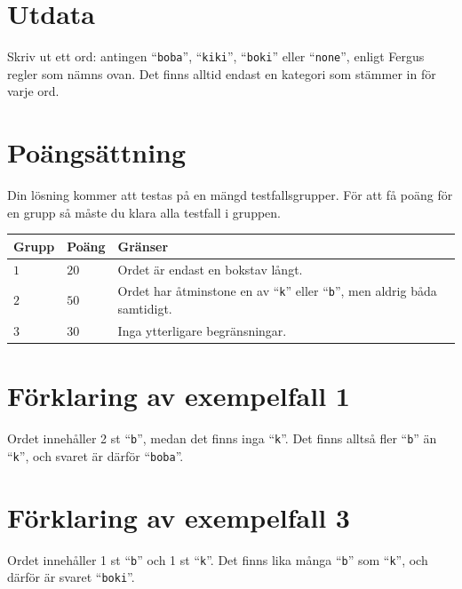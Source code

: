 \section*{Utdata}
Skriv ut ett ord: antingen ``\texttt{boba}'', ``\texttt{kiki}'', ``\texttt{boki}'' eller ``\texttt{none}'', enligt Fergus regler som nämns ovan.
Det finns alltid endast en kategori som stämmer in för varje ord.

\section*{Poängsättning}
Din lösning kommer att testas på en mängd testfallsgrupper.
För att få poäng för en grupp så måste du klara alla testfall i gruppen.

\noindent
\begin{tabular}{| l | l | p{12cm} |}
  \hline
  \textbf{Grupp} & \textbf{Poäng} & \textbf{Gränser} \\ \hline
  $1$    & $20$       & Ordet är endast en bokstav långt. \\ \hline
  $2$    & $50$       & Ordet har åtminstone en av ``\texttt{k}'' eller ``\texttt{b}'', men aldrig båda samtidigt. \\ \hline
  $3$    & $30$       & Inga ytterligare begränsningar. \\ \hline
\end{tabular}

\section*{Förklaring av exempelfall 1}
Ordet innehåller 2 st ``\texttt{b}'', medan det finns inga ``\texttt{k}''. Det finns alltså fler ``\texttt{b}'' än ``\texttt{k}'', och svaret är därför ``\texttt{boba}''.

\section*{Förklaring av exempelfall 3}
Ordet innehåller 1 st ``\texttt{b}'' och 1 st ``\texttt{k}''. Det finns lika många ``\texttt{b}'' som ``\texttt{k}'', och därför är svaret ``\texttt{boki}''.
